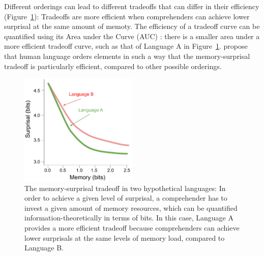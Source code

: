 \documentclass[11pt,letterpaper]{article}
\newcommand{\citet}{\Textcite}
\newcommand\mhahn[1]{{\color{red}(#1)}}
\begin{document}
Different orderings can lead to different tradeoffs that can differ in their efficiency (Figure~\ref{fig:tradeoff}): Tradeoffs are more efficient when comprehenders can achieve lower surprisal at the same amount of memoty.
The efficiency of a tradeoff curve can be quantified using its Area under the Curve (AUC) \citet{Hahn2020modeling}: there is a smaller area under a more efficient tradeoff curve, such as that of Language A in Figure~\ref{fig:tradeoff}.
\citet{Hahn2020modeling} propose that human language orders elements in such a way that the memory-surprisal tradeoff is particularly efficient, compared to other possible orderings.

\begin{figure}
    \centering
    \includegraphics[width=0.5\textwidth]{figures/tradeoff.pdf}
    \caption{The memory-surprisal tradeoff in two hypothetical languages: In order to achieve a given level of surprisal, a comprehender has to invest a given amount of memory resources, which can be quantified information-theoretically in terms of bits. In this case, Language A provides a more efficient tradeoff because comprehenders can achieve lower surprisals at the same levels of memory load, compared to Language B.}
    \label{fig:tradeoff}
\end{figure}
\end{document}

